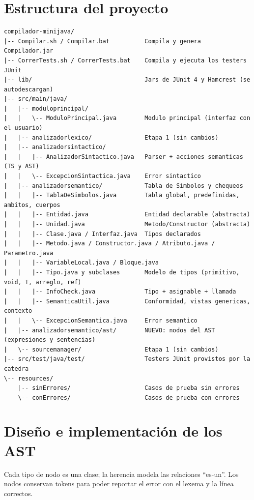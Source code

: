 \documentclass[11pt,a4paper]{article}
\begin{document}
\section{Estructura del proyecto}

{\footnotesize
\begin{verbatim}
compilador-minijava/
|-- Compilar.sh / Compilar.bat          Compila y genera Compilador.jar
|-- CorrerTests.sh / CorrerTests.bat    Compila y ejecuta los testers JUnit
|-- lib/                                Jars de JUnit 4 y Hamcrest (se autodescargan)
|-- src/main/java/
|   |-- moduloprincipal/
|   |   \-- ModuloPrincipal.java        Modulo principal (interfaz con el usuario)
|   |-- analizadorlexico/               Etapa 1 (sin cambios)
|   |-- analizadorsintactico/
|   |   |-- AnalizadorSintactico.java   Parser + acciones semanticas (TS y AST)
|   |   \-- ExcepcionSintactica.java    Error sintactico
|   |-- analizadorsemantico/            Tabla de Simbolos y chequeos
|   |   |-- TablaDeSimbolos.java        Tabla global, predefinidas, ambitos, cuerpos
|   |   |-- Entidad.java                Entidad declarable (abstracta)
|   |   |-- Unidad.java                 Metodo/Constructor (abstracta)
|   |   |-- Clase.java / Interfaz.java  Tipos declarados
|   |   |-- Metodo.java / Constructor.java / Atributo.java / Parametro.java
|   |   |-- VariableLocal.java / Bloque.java
|   |   |-- Tipo.java y subclases       Modelo de tipos (primitivo, void, T, arreglo, ref)
|   |   |-- InfoCheck.java              Tipo + asignable + llamada
|   |   |-- SemanticaUtil.java          Conformidad, vistas genericas, contexto
|   |   \-- ExcepcionSemantica.java     Error semantico
|   |-- analizadorsemantico/ast/        NUEVO: nodos del AST (expresiones y sentencias)
|   \-- sourcemanager/                  Etapa 1 (sin cambios)
|-- src/test/java/test/                 Testers JUnit provistos por la catedra
\-- resources/
    |-- sinErrores/                     Casos de prueba sin errores
    \-- conErrores/                     Casos de prueba con errores
\end{verbatim}
}

\section{Diseño e implementación de los AST}

Cada tipo de nodo es una clase; la herencia modela las relaciones ``es-un''. Los
nodos conservan tokens para poder reportar el error con el lexema y la línea
correctos.
\end{document}

